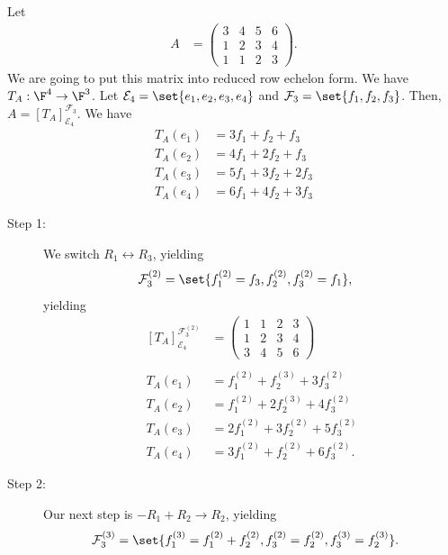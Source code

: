\documentclass[10pt]{mypackage}
\begin{document}
\begin{example}
  Let
  \begin{align*}
    A &= \begin{pmatrix}3 & 4 & 5 & 6 \\ 1 & 2 & 3 & 4 \\ 1 & 1 & 2 & 3\end{pmatrix}.
  \end{align*}
  We are going to put this matrix into reduced row echelon form. We have $T_A: \F^4 \rightarrow \F^3$. Let $\mathcal{E}_4 = \set{e_1,e_2,e_3,e_4}$ and $\mathcal{F}_3 = \set{f_1,f_2,f_3}$. Then, $A = \left[T_A\right]_{\mathcal{E}_4}^{\mathcal{F}_3}$. We have
  \begin{align*}
    T_A\left(e_1\right) &= 3f_1 + f_2 + f_3\\
    T_A\left(e_2\right) &= 4f_1 + 2f_2 + f_3\\
    T_A\left(e_3\right) &= 5f_1 + 3f_2 + 2f_3\\
    T_A\left(e_4\right) &= 6f_1 + 4f_2 + 3f_3
  \end{align*}
  \begin{description}
    \item[Step 1:] We switch $R_1\leftrightarrow R_3$, yielding
      \begin{align*}
        \mathcal{F}_3^{(2)} &= \set{f_1^{(2)} = f_3,f_{2}^{(2)},f_{3}^{(2)} = f_1},
      \end{align*}
      yielding
      \begin{align*}
        \left[T_{A}\right]_{\mathcal{E}_4}^{\mathcal{F}_3^{(2)}} &= \begin{pmatrix}1 & 1 & 2 & 3 \\ 1 & 2 & 3 & 4 \\ 3 & 4 & 5 & 6\end{pmatrix}\\
        \\
        T_A\left(e_1\right) &= f_1^{(2)} + f_{2}^{(3)} + 3f_{3}^{(2)}\\
        T_A\left(e_2\right) &= f_{1}^{(2)} + 2f_{2}^{(3)} + 4f_3^{(2)}\\
        T_A\left(e_3\right) &= 2f_1^{(2)} + 3f_2^{(2)} + 5f_3^{(2)}\\
        T_A\left(e_4\right) &= 3f_1^{(2)} + f_2^{(2)} + 6f_3^{(2)}.
      \end{align*}
    \item[Step 2:] Our next step is $-R_1 + R_2 \rightarrow R_2$, yielding
      \begin{align*}
        \mathcal{F}_3^{(3)} &= \set{f_1^{(3)} = f_1^{(2)} + f_{2}^{(2)},f_{3}^{(2)} = f_{2}^{(2)},f_{3}^{(3)} = f_{2}^{(3)}}.

\end{align*}
\end{description}
\end{example}
\end{document}
